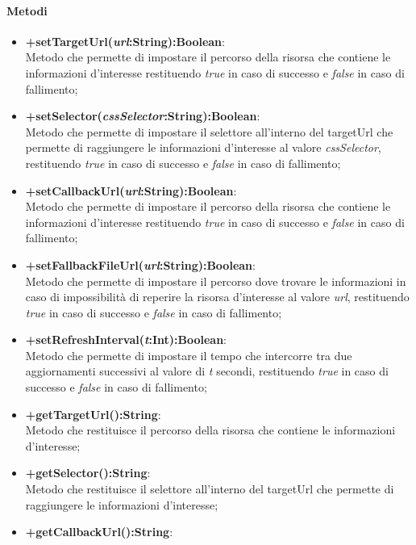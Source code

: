 \paragraph{Metodi}
\begin{itemize}
	\item \textbf{+setTargetUrl(\textit{url}:String):Boolean}:\\
	Metodo che permette di impostare il percorso della risorsa che contiene le informazioni d'interesse restituendo \textit{true} in caso di successo e \textit{false} in caso di fallimento;
	\item \textbf{+setSelector(\textit{cssSelector}:String):Boolean}:\\
	Metodo che permette di impostare il selettore all'interno del targetUrl che permette di raggiungere le informazioni d'interesse al valore \textit{cssSelector}, restituendo \textit{true} in caso di successo e \textit{false} in caso di fallimento;
	\item \textbf{+setCallbackUrl(\textit{url}:String):Boolean}:\\
	Metodo che permette di impostare il percorso della risorsa che contiene le informazioni d'interesse restituendo \textit{true} in caso di successo e \textit{false} in caso di fallimento;
	\item \textbf{+setFallbackFileUrl(\textit{url}:String):Boolean}:\\
	Metodo che permette di impostare il percorso dove trovare le informazioni in caso di impossibilità di reperire la risorsa d'interesse al valore \textit{url}, restituendo \textit{true} in caso di successo e \textit{false} in caso di fallimento;
	\item \textbf{+setRefreshInterval(\textit{t}:Int):Boolean}:\\
	Metodo che permette di impostare il tempo che intercorre tra due aggiornamenti successivi al valore di \textit{t} secondi, restituendo \textit{true} in caso di successo e \textit{false} in caso di fallimento;
	\item \textbf{+getTargetUrl():String}:\\
	Metodo che restituisce il percorso della risorsa che contiene le informazioni d'interesse;
	\item \textbf{+getSelector():String}:\\
	Metodo che restituisce il selettore all'interno del targetUrl che permette di raggiungere le informazioni d'interesse;
	\item \textbf{+getCallbackUrl():String}:\\

\end{itemize}
